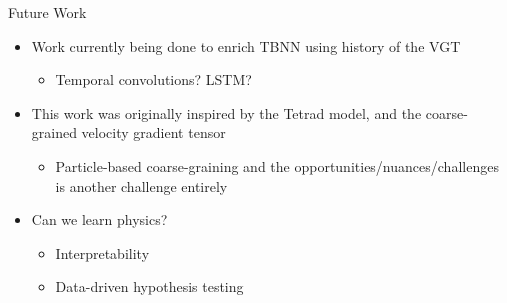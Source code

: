 \begin{frame}{Future Work}
  \begin{itemize}
  \item Work currently being done to enrich TBNN using history of the VGT
    \begin{itemize}
    \item Temporal convolutions? LSTM?
    \end{itemize}
  \item This work was originally inspired by the Tetrad model, and the coarse-grained velocity gradient tensor
    \begin{itemize}
    \item Particle-based coarse-graining and the opportunities/nuances/challenges is another challenge entirely
    \end{itemize}
  \item Can we learn physics?
    \begin{itemize}
    \item Interpretability
    \item Data-driven hypothesis testing
    \end{itemize}
  \end{itemize}
\end{frame}
